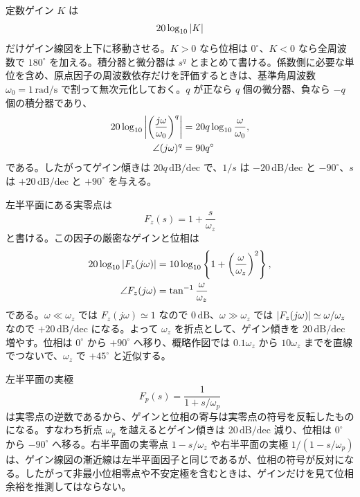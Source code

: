 定数ゲイン $K$ は
\begin{equation}
  20\log_{10}\left|K\right|
\end{equation}
だけゲイン線図を上下に移動させる。$K>0$ なら位相は $0^\circ$、$K<0$ なら全周波数で $180^\circ$ を加える。積分器と微分器は $s^q$ とまとめて書ける。係数側に必要な単位を含め、原点因子の周波数依存だけを評価するときは、基準角周波数 $\omega_0=1\,\mathrm{rad/s}$ で割って無次元化しておく。$q$ が正なら $q$ 個の微分器、負なら $-q$ 個の積分器であり、
\begin{align}
  20\log_{10}\left|\left(\frac{j\omega}{\omega_0}\right)^q\right|
    &=20q\log_{10}\frac{\omega}{\omega_0},\\
  \angle (j\omega)^q
    &=90q^\circ
\end{align}
である。したがってゲイン傾きは $20q\,\mathrm{dB/dec}$ で、$1/s$ は $-20\,\mathrm{dB/dec}$ と $-90^\circ$、$s$ は $+20\,\mathrm{dB/dec}$ と $+90^\circ$ を与える。

左半平面にある実零点は
\begin{equation}
  F_z(s)=1+\frac{s}{\omega_z}
\end{equation}
と書ける。この因子の厳密なゲインと位相は
\begin{align}
  20\log_{10}\left|F_z(j\omega)\right|
    &=10\log_{10}\left\{1+\left(\frac{\omega}{\omega_z}\right)^2\right\},\\
  \angle F_z(j\omega)
    &=\tan^{-1}\frac{\omega}{\omega_z}
\end{align}
である。$\omega\ll\omega_z$ では $F_z(j\omega)\simeq1$ なので $0\,\mathrm{dB}$、$\omega\gg\omega_z$ では $\left|F_z(j\omega)\right|\simeq\omega/\omega_z$ なので $+20\,\mathrm{dB/dec}$ になる。よって $\omega_z$ を折点として、ゲイン傾きを $20\,\mathrm{dB/dec}$ 増やす。位相は $0^\circ$ から $+90^\circ$ へ移り、概略作図では $0.1\omega_z$ から $10\omega_z$ までを直線でつないで、$\omega_z$ で $+45^\circ$ と近似する。

左半平面の実極
\begin{equation}
  F_p(s)=\frac{1}{1+s/\omega_p}
\end{equation}
は実零点の逆数であるから、ゲインと位相の寄与は実零点の符号を反転したものになる。すなわち折点 $\omega_p$ を越えるとゲイン傾きは $20\,\mathrm{dB/dec}$ 減り、位相は $0^\circ$ から $-90^\circ$ へ移る。右半平面の実零点 $1-s/\omega_z$ や右半平面の実極 $1/(1-s/\omega_p)$ は、ゲイン線図の漸近線は左半平面因子と同じであるが、位相の符号が反対になる。したがって非最小位相零点や不安定極を含むときは、ゲインだけを見て位相余裕を推測してはならない。

